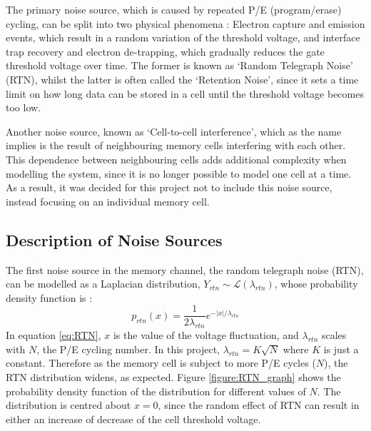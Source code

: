 \documentclass[11pt]{article}
\numberwithin{equation}{subsection}
\begin{document}
The primary noise source, which is caused by repeated P/E (program/erase) cycling, can be split into two physical phenomena \cite{dong2012estimating}: Electron capture and emission events, which result in a random variation of the threshold voltage, and interface trap recovery and electron de-trapping, which gradually reduces the gate threshold voltage over time. The former is known as `Random Telegraph Noise' (RTN), whilst the latter is often called the `Retention Noise', since it sets a time limit on how long data can be stored in a cell until the threshold voltage becomes too low.

Another noise source, known as `Cell-to-cell interference', which as the name implies is the result of neighbouring memory cells interfering with each other. This dependence between neighbouring cells adds additional complexity when modelling the system, since it is no longer possible to model one cell at a time. As a result, it was decided for this project not to include this noise source, instead focusing on an individual memory cell.

\subsection{Description of Noise Sources}

The first noise source in the memory channel, the random telegraph noise (RTN), can be modelled as a Laplacian distribution, $Y_{rtn} \sim \mathcal{L}(\lambda_{rtn})$, whose probability density function is \cite{dong2012estimating}:
\begin{equation} \label{eq:RTN}
p_{rtn}(x) = \dfrac{1}{2\lambda_{rtn}}e^{-\lvert x \rvert / \lambda_{rtn}}
\end{equation}
In equation \ref{eq:RTN}, $x$ is the value of the voltage fluctuation, and $\lambda_{rtn}$ scales with $N$, the P/E cycling number. In this project, $\lambda_{rtn} = K \sqrt{N}$ where $K$ is just a constant. Therefore as the memory cell is subject to more P/E cycles ($N$), the RTN distribution widens, as expected. Figure \ref{figure:RTN_graph} shows the probability density function of the distribution for different values of $N$. The distribution is centred about $x=0$, since the random effect of RTN can result in either an increase of decrease of the cell threshold voltage.
\end{document}
